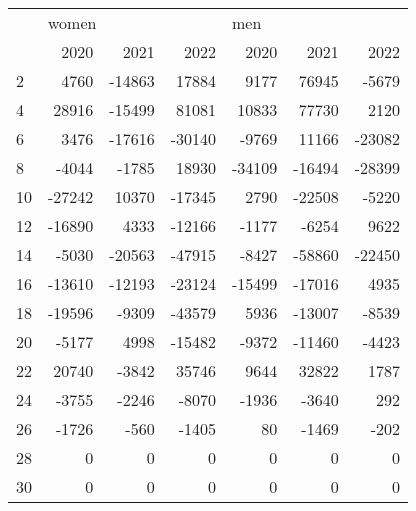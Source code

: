 \begin{tabular}{lrrrrrr}
\toprule
{} & \multicolumn{3}{l}{women} & \multicolumn{3}{l}{men} \\
{} &   2020 &   2021 &   2022 &   2020 &   2021 &   2022 \\
\midrule
2  &   4760 & -14863 &  17884 &   9177 &  76945 &  -5679 \\
4  &  28916 & -15499 &  81081 &  10833 &  77730 &   2120 \\
6  &   3476 & -17616 & -30140 &  -9769 &  11166 & -23082 \\
8  &  -4044 &  -1785 &  18930 & -34109 & -16494 & -28399 \\
10 & -27242 &  10370 & -17345 &   2790 & -22508 &  -5220 \\
12 & -16890 &   4333 & -12166 &  -1177 &  -6254 &   9622 \\
14 &  -5030 & -20563 & -47915 &  -8427 & -58860 & -22450 \\
16 & -13610 & -12193 & -23124 & -15499 & -17016 &   4935 \\
18 & -19596 &  -9309 & -43579 &   5936 & -13007 &  -8539 \\
20 &  -5177 &   4998 & -15482 &  -9372 & -11460 &  -4423 \\
22 &  20740 &  -3842 &  35746 &   9644 &  32822 &   1787 \\
24 &  -3755 &  -2246 &  -8070 &  -1936 &  -3640 &    292 \\
26 &  -1726 &   -560 &  -1405 &     80 &  -1469 &   -202 \\
28 &      0 &      0 &      0 &      0 &      0 &      0 \\
30 &      0 &      0 &      0 &      0 &      0 &      0 \\
\bottomrule
\end{tabular}
